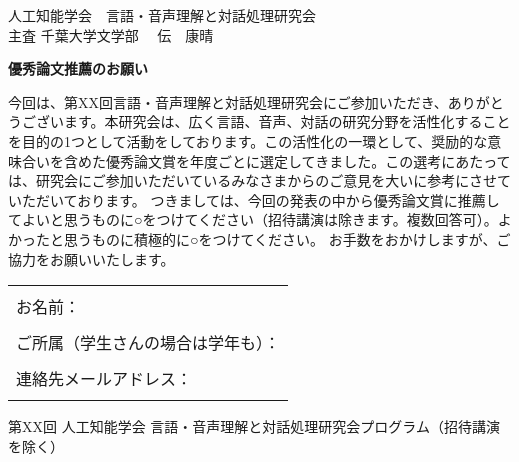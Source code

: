 \documentclass[a4paper,10pt]{jarticle}
\def\GM{千葉大学文学部 　伝　康晴}
\def\ORDER{XX}
\def\NOTE{招待講演を除く}
\begin{document}
\begin{flushright}
人工知能学会　言語・音声理解と対話処理研究会\\
主査 \GM
\end{flushright}


\begin{center}
\large \bf
優秀論文推薦のお願い	
\end{center}


今回は、第{\ORDER}回言語・音声理解と対話処理研究会にご参加いただき、ありがとうございます。本研究会は、広く言語、音声、対話の研究分野を活性化することを目的の1つとして活動をしております。この活性化の一環として、奨励的な意味合いを含めた優秀論文賞を年度ごとに選定してきました。この選考にあたっては、研究会にご参加いただいているみなさまからのご意見を大いに参考にさせていただいております。
つきましては、今回の発表の中から優秀論文賞に推薦してよいと思うものに○をつけてください（招待講演は除きます。複数回答可）。よかったと思うものに積極的に○をつけてください。
お手数をおかけしますが、ご協力をお願いいたします。

\begin{table}[h]
\begin{tabular}{p{17.5cm}}
\hline
\\
お名前： \\
\\
ご所属（学生さんの場合は学年も）：\\
\\
連絡先メールアドレス：\\
\\
\hline
\end{tabular}
\end{table}

\begin{center}
第{\ORDER}回 人工知能学会 言語・音声理解と対話処理研究会プログラム（\NOTE）	
\end{center}



\end{document}
